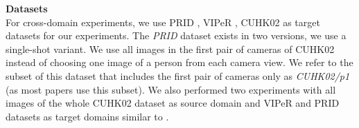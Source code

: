 

\bigskip
\indent\textbf{Datasets}\\
For cross-domain experiments, we use PRID \citep{Hirzer_h.:person}, VIPeR \citep{Gray07evaluatingappearance}, CUHK02 \citep{li2013locally} as target datasets for our experiments.  The \textit{PRID} dataset exists in two versions, we use a single-shot variant. 
We use all images in the first  pair of cameras of CUHK02 instead of choosing one image of a person from each camera view.  We refer to the subset of this dataset that includes the first pair of cameras only as \textit{CUHK02/p1} (as most papers use this subset). We also performed two experiments with all images of the whole CUHK02 dataset as source domain and VIPeR and PRID datasets as target domains similar to \citep{Yi14}.


